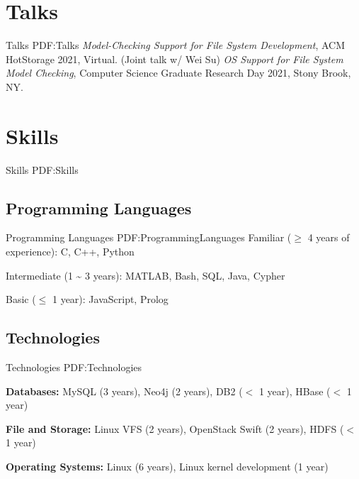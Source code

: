 \documentclass[letterpaper,10pt,oneside]{article}
\begin{document}
\begin{body}
\section
{Talks}
{Talks}
{PDF:Talks}
\BulletItem
\emph{Model-Checking Support for File System Development}, ACM HotStorage 2021, Virtual. (Joint talk w/ Wei Su)
\GapNoBreak
\BulletItem
\emph{OS Support for File System Model Checking}, 
Computer Science Graduate Research Day 2021, Stony Brook, NY.
\GapNoBreak



\section
{Skills}
{Skills}
{PDF:Skills}


\subsection
{Programming Languages}
{Programming Languages}
{PDF:ProgrammingLanguages}
\GapNoBreak
\BulletItem
Familiar ($\geq$ 4 years of experience): C, C++, Python

\GapNoBreak
\BulletItem
Intermediate (1 {\textasciitilde} 3 years): MATLAB, Bash, SQL, Java, Cypher

\GapNoBreak
\BulletItem
Basic ($\leq$ 1 year): JavaScript, Prolog
\GapNoBreak
\subsection
{Technologies}
{Technologies}
{PDF:Technologies}

\GapNoBreak
\BulletItem
\textbf{Databases:} MySQL (3 years), Neo4j (2 years), DB2 ($<$ 1 year), HBase ($<$ 1 year)

\GapNoBreak
\BulletItem
\textbf{File and Storage:} Linux VFS (2 years), OpenStack Swift (2 years), HDFS ($<$ 1 year)



\GapNoBreak
\BulletItem
\textbf{Operating Systems:} Linux (6 years), Linux kernel development (1 year)



\end{body}
\end{document}
